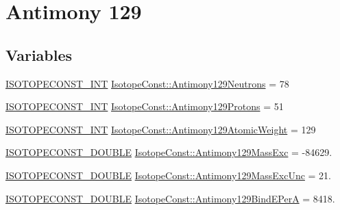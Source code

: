 \hypertarget{group___isotope_const-_antimony-_sb129}{}\section{Antimony 129}
\label{group___isotope_const-_antimony-_sb129}
\subsection*{Variables}
\begin{DoxyCompactItemize}
\item 
\mbox{\hyperlink{group___isotope_const-_macros_ga5f18360b3e99483a35c32d789e62621c}{I\+S\+O\+T\+O\+P\+E\+C\+O\+N\+S\+T\+\_\+\+I\+NT}} \mbox{\hyperlink{group___isotope_const-_antimony-_sb129_gaf356b6436e04e053ff3d594ac5e14d5c}{Isotope\+Const\+::\+Antimony129\+Neutrons}} = 78
\item 
\mbox{\hyperlink{group___isotope_const-_macros_ga5f18360b3e99483a35c32d789e62621c}{I\+S\+O\+T\+O\+P\+E\+C\+O\+N\+S\+T\+\_\+\+I\+NT}} \mbox{\hyperlink{group___isotope_const-_antimony-_sb129_gaef447a05a4f0ec4c3f9d0b9bbea3c4ce}{Isotope\+Const\+::\+Antimony129\+Protons}} = 51
\item 
\mbox{\hyperlink{group___isotope_const-_macros_ga5f18360b3e99483a35c32d789e62621c}{I\+S\+O\+T\+O\+P\+E\+C\+O\+N\+S\+T\+\_\+\+I\+NT}} \mbox{\hyperlink{group___isotope_const-_antimony-_sb129_gab5ce21efdc08267778f12d6d78ee4118}{Isotope\+Const\+::\+Antimony129\+Atomic\+Weight}} = 129
\item 
\mbox{\hyperlink{group___isotope_const-_macros_ga8f45a7272ce02c0b4c65c44636ed719a}{I\+S\+O\+T\+O\+P\+E\+C\+O\+N\+S\+T\+\_\+\+D\+O\+U\+B\+LE}} \mbox{\hyperlink{group___isotope_const-_antimony-_sb129_gafdb020dbaf390a1ea44020411ec70aaa}{Isotope\+Const\+::\+Antimony129\+Mass\+Exc}} = -\/84629.
\item 
\mbox{\hyperlink{group___isotope_const-_macros_ga8f45a7272ce02c0b4c65c44636ed719a}{I\+S\+O\+T\+O\+P\+E\+C\+O\+N\+S\+T\+\_\+\+D\+O\+U\+B\+LE}} \mbox{\hyperlink{group___isotope_const-_antimony-_sb129_gaf78cf8fa8cf7b1e80390739da0754437}{Isotope\+Const\+::\+Antimony129\+Mass\+Exc\+Unc}} = 21.
\item 
\mbox{\hyperlink{group___isotope_const-_macros_ga8f45a7272ce02c0b4c65c44636ed719a}{I\+S\+O\+T\+O\+P\+E\+C\+O\+N\+S\+T\+\_\+\+D\+O\+U\+B\+LE}} \mbox{\hyperlink{group___isotope_const-_antimony-_sb129_gaacfbf9a3c08d9b2780ee714cb144382c}{Isotope\+Const\+::\+Antimony129\+Bind\+E\+PerA}} = 8418.
\item 

\end{DoxyCompactItemize}
